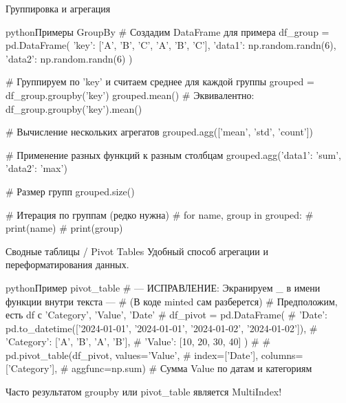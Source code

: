 \begin{textbox}{Группировка и агрегация}
\begin{codebox}{python}{Примеры GroupBy}
# Создадим DataFrame для примера
df_group = pd.DataFrame({
    'key': ['A', 'B', 'C', 'A', 'B', 'C'],
    'data1': np.random.randn(6),
    'data2': np.random.randn(6)
})

# Группируем по 'key' и считаем среднее для каждой группы
grouped = df_group.groupby('key')
grouped.mean()
# Эквивалентно: df_group.groupby('key').mean()

# Вычисление нескольких агрегатов
grouped.agg(['mean', 'std', 'count'])

# Применение разных функций к разным столбцам
grouped.agg({'data1': 'sum', 'data2': 'max'})

# Размер групп
grouped.size()

# Итерация по группам (редко нужна)
# for name, group in grouped:
#     print(name)
#     print(group)
\end{codebox}
\end{textbox}

\begin{alerttextbox}{Сводные таблицы / Pivot Tables}
Удобный способ агрегации и переформатирования данных.

\begin{codebox}{python}{Пример pivot\_table}
# --- ИСПРАВЛЕНИЕ: Экранируем _ в имени функции внутри текста ---
# (В коде minted сам разберется)
# Предположим, есть df с 'Category', 'Value', 'Date'
# df_pivot = pd.DataFrame({
#    'Date': pd.to_datetime(['2024-01-01', '2024-01-01', '2024-01-02', '2024-01-02']),
#    'Category': ['A', 'B', 'A', 'B'],
#    'Value': [10, 20, 30, 40] })
#
# pd.pivot_table(df_pivot, values='Value',
#                index=['Date'], columns=['Category'],
#                aggfunc=np.sum) # Сумма Value по датам и категориям
\end{codebox}
\alert{Часто результатом groupby или pivot\_table является MultiIndex!}
\end{alerttextbox}

